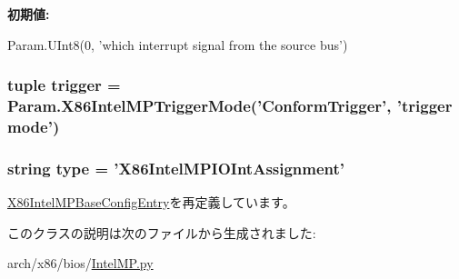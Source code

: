 {\bfseries 初期値:}
\begin{DoxyCode}
Param.UInt8(0,
            'which interrupt signal from the source bus')
\end{DoxyCode}
\hypertarget{classIntelMP_1_1X86IntelMPIOIntAssignment_a36374a82ee2259459ff75b5c4b46f2c9}{
\subsubsection[{trigger}]{\setlength{\rightskip}{0pt plus 5cm}tuple {\bf trigger} = Param.X86IntelMPTriggerMode('ConformTrigger', '{\bf trigger} mode')}}
\label{classIntelMP_1_1X86IntelMPIOIntAssignment_a36374a82ee2259459ff75b5c4b46f2c9}
\hypertarget{classIntelMP_1_1X86IntelMPIOIntAssignment_acce15679d830831b0bbe8ebc2a60b2ca}{
\subsubsection[{type}]{\setlength{\rightskip}{0pt plus 5cm}string {\bf type} = '{\bf X86IntelMPIOIntAssignment}'}}
\label{classIntelMP_1_1X86IntelMPIOIntAssignment_acce15679d830831b0bbe8ebc2a60b2ca}


\hyperlink{classIntelMP_1_1X86IntelMPBaseConfigEntry_acce15679d830831b0bbe8ebc2a60b2ca}{X86IntelMPBaseConfigEntry}を再定義しています。

このクラスの説明は次のファイルから生成されました:\begin{DoxyCompactItemize}
\item 
arch/x86/bios/\hyperlink{IntelMP_8py}{IntelMP.py}\end{DoxyCompactItemize}
